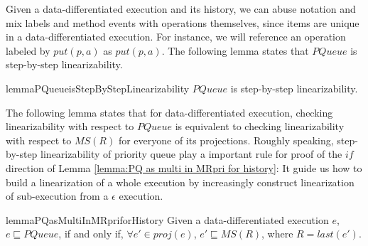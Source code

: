 Given a data-differentiated execution and its history, we can abuse notation and mix labels and method events with operations themselves, since items are unique in a data-differentiated execution. For instance, we will reference an operation labeled by $\textit{put}(p,a)$ as $\textit{put}(p,a)$. The following lemma states that $\textit{PQueue}$ is step-by-step linearizability.

\begin{restatable}{lemma}{PQueueisStepByStepLinearizability}
\label{lemma:PQueue is step-by-step linearizability}
$\textit{PQueue}$ is step-by-step linearizability.
\end{restatable}

The following lemma states that for data-differentiated execution, checking linearizability with respect to $\textit{PQueue}$ is equivalent to checking linearizability with respect to $\textit{MS}(R)$ for everyone of its projections. Roughly speaking, step-by-step linearizability of priority queue play a important rule for proof of the $\textit{if}$ direction of Lemma \ref{lemma:PQ as multi in MRpri for history}: It guide us how to build a linearization of a whole execution by increasingly construct linearization of sub-execution from a $\epsilon$ execution.

\begin{restatable}{lemma}{PQasMultiInMRpriforHistory}
\label{lemma:PQ as multi in MRpri for history}
Given a data-differentiated execution $e$, $e \sqsubseteq \textit{PQueue}$, if and only if, $\forall e' \in \textit{proj}(e)$, $e' \sqsubseteq \textit{MS}(R)$, where $R = \textit{last}(e')$.
\end{restatable}

